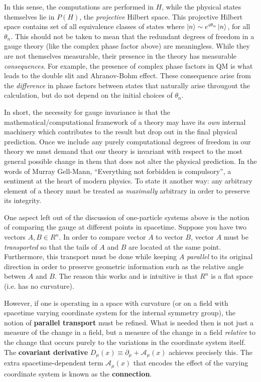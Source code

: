 In this sense, the computations are performed in $H$, while the physical states themselves lie in $P(H)$, the \textit{projective} Hilbert space.
This projective Hilbert space contains set of all equivalence classes of states where $\ket{n} \sim e^{i\theta_n}\ket{n}$, for all $\theta_n$.
This should not be taken to mean that the redundant degrees of freedom in a gauge theory (like the complex phase factor above) are meaningless. 
While they are not themselves measurable, their presence in the theory has measurable \textit{consequences}.
For example, the presence of complex phase factors in QM is what leads to the double slit and Ahranov-Bohm effect.
These consequence arise from the \textit{difference} in phase factors between states that naturally arise througout the calculation, but do not depend on the initial choices of $\theta_n$.

In short, the necessity for gauge invariance is that the mathematical/computational framework of a theory may have its \textit{own} internal machinery which contributes to the result but drop out in the final physical prediction.
Once we include any purely computational degrees of freedom in our theory we must demand that our theory is invariant with respect to the most general possible change in them that does not alter the physical prediction.
In the words of Murray Gell-Mann, ``Everything not forbidden is compulsory'', a sentiment at the heart of modern physics.
To state it another way: any arbitrary element of a theory must be treated as \textit{maximally} arbitrary in order to preserve its integrity.

One aspect left out of the discussion of one-particle systems above is the notion of comparing the gauge at different points in spacetime.
Suppose you have two vectors $A,B \in R^n$. In order to compare vector $A$ to vector $B$, vector $A$ must be \textit{transported} so that the tails of $A$ and $B$ are located at the same point.
Furthermore, this transport must be done while keeping $A$ \textit{parallel} to its original direction in order to preserve geometric information such as the relative angle betwen $A$ and $B$.
The reason this works and is intuitive is that $R^n$ is a flat space (i.e. has no curvature).

\newcommand{\conn}{ \ensuremath{ \boldsymbol{\mathcal{A}} } }
However, if one is operating in a space with curvature (or on a field with spacetime varying coordinate system for the internal symmetry group), the notion of \textbf{parallel transport} must be refined.
What is needed then is not just a measure of the change in a field, but a measure of the change in a field \textit{relative} to the change that occurs purely to the variations in the coordinate system itself.
The \textbf{covariant derivative} $D_\mu(x) \equiv \partial_\mu + \conn_\mu(x)$ achieves precisely this.
The extra spacetime-dependent term $\conn_\mu(x)$ that encodes the effect of the varying coordinate system is known as the \textbf{connection}.

